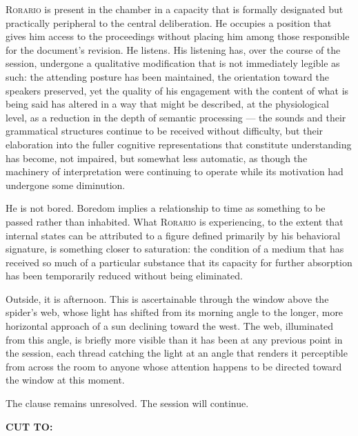 \documentclass[12pt, oneside]{article}
\newenvironment{action}{%
  \vspace{0.6em}%
  \noindent\ignorespaces%
}{%
  \par\vspace{0.6em}%
}
\newcommand{\scenenumber}[1]{%
  \vspace{1em}%
  \noindent{\small\bfseries\scshape Scene #1}%
  \vspace{0.3em}\par%
}
\newcommand{\transition}[1]{%
  \vspace{0.8em}%
  \begin{flushright}%
    \bfseries #1%
  \end{flushright}%
  \vspace{0.5em}%
}
\begin{document}
\begin{action}
\textsc{Rorario} is present in the chamber in a capacity that is formally designated but practically peripheral to the central deliberation. He occupies a position that gives him access to the proceedings without placing him among those responsible for the document's revision. He listens. His listening has, over the course of the session, undergone a qualitative modification that is not immediately legible as such: the attending posture has been maintained, the orientation toward the speakers preserved, yet the quality of his engagement with the content of what is being said has altered in a way that might be described, at the physiological level, as a reduction in the depth of semantic processing --- the sounds and their grammatical structures continue to be received without difficulty, but their elaboration into the fuller cognitive representations that constitute understanding has become, not impaired, but somewhat less automatic, as though the machinery of interpretation were continuing to operate while its motivation had undergone some diminution.

He is not bored. Boredom implies a relationship to time as something to be passed rather than inhabited. What \textsc{Rorario} is experiencing, to the extent that internal states can be attributed to a figure defined primarily by his behavioral signature, is something closer to saturation: the condition of a medium that has received so much of a particular substance that its capacity for further absorption has been temporarily reduced without being eliminated.

Outside, it is afternoon. This is ascertainable through the window above the spider's web, whose light has shifted from its morning angle to the longer, more horizontal approach of a sun declining toward the west. The web, illuminated from this angle, is briefly more visible than it has been at any previous point in the session, each thread catching the light at an angle that renders it perceptible from across the room to anyone whose attention happens to be directed toward the window at this moment.

The clause remains unresolved. The session will continue.
\end{action}

\transition{CUT TO:}

\scenenumber{7a — Street Theater: The Sacrifice}
\end{document}
